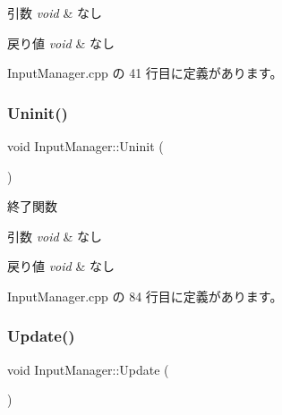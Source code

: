 \begin{DoxyParams}{引数}
{\em void} & なし \\
\hline
\end{DoxyParams}

\begin{DoxyRetVals}{戻り値}
{\em void} & なし \\
\hline
\end{DoxyRetVals}


 Input\+Manager.\+cpp の 41 行目に定義があります。

\mbox{\label{class_input_manager_adbed7acd819d7c75a97c728028b067d5}} 
\subsubsection{\texorpdfstring{Uninit()}{Uninit()}}
{\footnotesize\ttfamily void Input\+Manager\+::\+Uninit (\begin{DoxyParamCaption}{ }\end{DoxyParamCaption})}



終了関数 


\begin{DoxyParams}{引数}
{\em void} & なし \\
\hline
\end{DoxyParams}

\begin{DoxyRetVals}{戻り値}
{\em void} & なし \\
\hline
\end{DoxyRetVals}


 Input\+Manager.\+cpp の 84 行目に定義があります。

\mbox{\label{class_input_manager_aa5480931dba2720e7d80dd00a53adae0}} 
\subsubsection{\texorpdfstring{Update()}{Update()}}
{\footnotesize\ttfamily void Input\+Manager\+::\+Update (\begin{DoxyParamCaption}{ }\end{DoxyParamCaption})}



